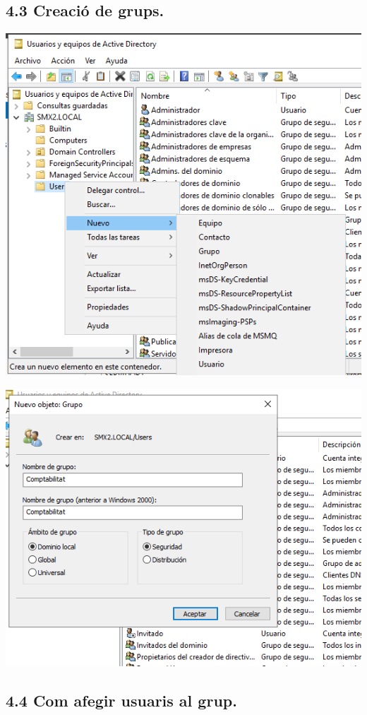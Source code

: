 \documentclass[
  a4paper,
]{article}
\begin{document}
\subsection{4.3 Creació de grups.}\label{creaciuxf3-de-grups.}

\includegraphics{png/usuaris11.png}

\includegraphics{png/usuaris12.png}

\subsection{4.4 Com afegir usuaris al
grup.}\label{com-afegir-usuaris-al-grup.}
\end{document}
